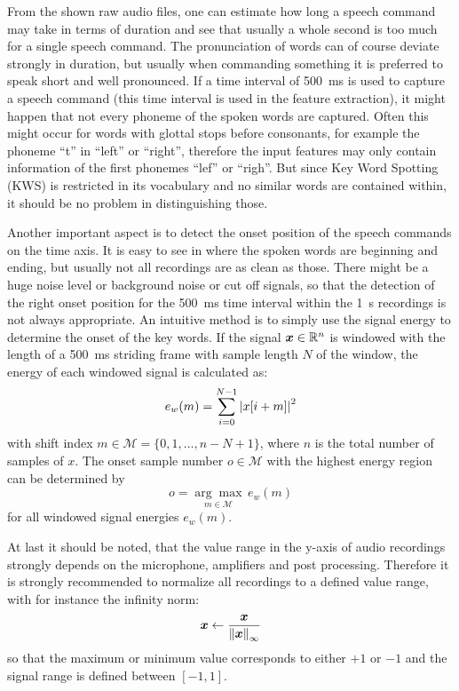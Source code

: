From the shown raw audio files, one can estimate how long a speech command may take in terms of duration and see that usually a whole second is too much for a single speech command.
The pronunciation of words can of course deviate strongly in duration, but usually when commanding something it is preferred to speak short and well pronounced.
If a time interval of \SI{500}{\milli\second} is used to capture a speech command (this time interval is used in the feature extraction), it might happen that not every phoneme of the spoken words are captured. 
Often this might occur for words with glottal stops before consonants, for example the phoneme \enquote{t} in \enquote{left} or \enquote{right}, therefore the input features may only contain information of the first phonemes \enquote{lef} or \enquote{righ}.
But since Key Word Spotting (KWS) is restricted in its vocabulary and no similar words are contained within, it should be no problem in distinguishing those.

Another important aspect is to detect the onset position of the speech commands on the time axis. 
It is easy to see in  where the spoken words are beginning and ending, but usually not all recordings are as clean as those.
There might be a huge noise level or background noise or cut off signals, so that the detection of the right onset position for the \SI{500}{\milli\second} time interval within the \SI{1}{\second} recordings is not always appropriate.
An intuitive method is to simply use the signal energy to determine the onset of the key words.
If the signal $\bm{x} \in \mathbb{R}^n$ is windowed with the length of a \SI{500}{\milli\second} striding frame with sample length $N$ of the window, the energy of each windowed signal is calculated as:
\begin{equation}
  e_{w}(m) = \sum_{i=0}^{N-1} \abs{x[i + m]}^2
\end{equation}
with shift index $m \in \mathcal{M} = \{0, 1, \dots, n - N + 1\}$, where $n$ is the total number of samples of $x$.
The onset sample number $o \in \mathcal{M}$ with the highest energy region can be determined by
\begin{equation}
  o = \underset{m \in \mathcal{M}}{\arg \max} \, e_{w}(m)
\end{equation}
for all windowed signal energies $e_{w}(m)$.

At last it should be noted, that the value range in the y-axis of audio recordings strongly depends on the microphone, amplifiers and post processing.
Therefore it is strongly recommended to normalize all recordings to a defined value range, with for instance the infinity norm:
\begin{equation}
  \bm{x} \gets \frac{\bm{x}}{\norm{\bm{x}}_\infty}
\end{equation}
so that the maximum or minimum value corresponds to either $+1$ or $-1$ and the signal range is defined between $[-1, 1]$.